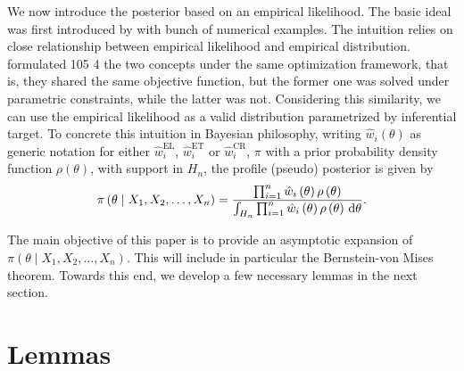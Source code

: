 We now introduce the posterior based on an empirical likelihood. The
basic ideal was first introduced by \citet{lazar2003bayesian} with
bunch of numerical examples. The intuition relies on close relationship
between empirical likelihood and empirical distribution. \citet{owen2010empirical}
formulated 105 4 the two concepts under the same optimization framework,
that is, they shared the same objective function, but the former one
was solved under parametric constraints, while the latter was not.
Considering this similarity, we can use the empirical likelihood as
a valid distribution parametrized by inferential target. To concrete
this intuition in Bayesian philosophy, writing $\hat{w}_{i}\left(\theta\right)$
as generic notation for either $\hat{w}_{i}^{\mathrm{EL}}$, $\hat{w}_{i}^{\mathrm{ET}}$
or $\hat{w}_{i}^{\mathrm{CR}}$, $\pi$ with a prior probability density
function $\rho\left(\theta\right)$, with support in $H_{n}$, the
profile (pseudo) posterior is given by 
\begin{equation}
\pi\left(\theta\mid X_{1},X_{2},\ldots,X_{n}\right)=\frac{\prod_{i=1}^{n}\hat{w}_{i}\left(\theta\right)\rho\left(\theta\right)}{\int_{H_{n}}\prod_{i=1}^{n}\hat{w}_{i}\left(\theta\right)\rho\left(\theta\right)\,\mathrm{d}\theta}.\label{eq:poster-el-expression}
\end{equation}


The main objective of this paper is to provide an asymptotic expansion
of $\pi\left(\theta\mid X_{1},X_{2},\ldots,X_{n}\right)$. This will
include in particular the Bernstein-von Mises theorem. Towards this
end, we develop a few necessary lemmas in the next section.


\section{Lemmas}

